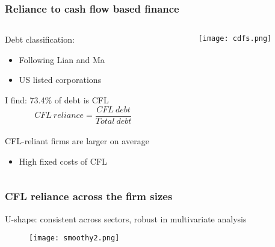 \documentclass[notes]{beamer}
\begin{document}
\begin{frame}
  \frametitle{Reliance to cash flow based finance}

  \begin{columns}
    \begin{column}{0.45\textwidth} %
   Debt classification: 
   \begin{itemize}
   \item Following Lian and Ma
   \item US listed corporations 
   \end{itemize}
   I find: 73.4\% of debt is CFL  \vspace{1mm}  \\
  $$ CFL \ reliance = \dfrac{CFL \  debt}{Total \  debt} $$ \vspace{3mm} \\ 
  CFL-reliant firms are larger on average 
  \begin{itemize}
  \item   High fixed costs of CFL
  \end{itemize}        
    \end{column}
    \begin{column}{0.55\textwidth} %
      \begin{figure}
        \texttt{[image: cdfs.png]} %
      \end{figure}
    \end{column}
  \end{columns}
\end{frame}


\begin{frame}[label=slide2]
\frametitle{CFL reliance across the firm sizes}
U-shape: consistent across sectors, robust in multivariate analysis
\begin{figure} [H]
\centering
\texttt{[image: smoothy2.png]}
\end{figure}  
\end{frame}
\end{document}
